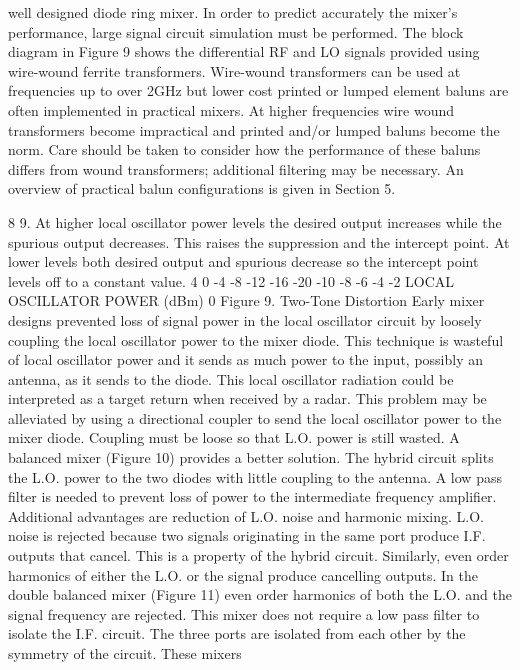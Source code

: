 \documentclass[a4paper,10pt]{article}
\begin{document}
well designed diode ring mixer. In order to predict accurately the mixer’s performance, large signal circuit
simulation must be performed.
The block diagram in Figure 9 shows the differential RF and LO signals provided using wire-wound ferrite
transformers. Wire-wound transformers can be used at frequencies up to over 2GHz but lower cost printed or
lumped element baluns are often implemented in practical mixers. At higher frequencies wire wound
transformers become impractical and printed and/or lumped baluns become the norm. Care should be taken to
consider how the performance of these baluns differs from wound transformers; additional filtering may be
necessary. An overview of practical balun configurations is given in Section 5.

	
	
	8
	9. At higher local oscillator power levels the desired output increases
	while the spurious output decreases. This raises the suppression and
	the intercept point. At lower levels both desired output and spurious
	decrease so the intercept point levels off to a constant value.
	4
	0
	-4
	-8
	-12
	-16
	-20
	-10
	-8
	-6
	-4
	-2
	LOCAL OSCILLATOR POWER (dBm)
	0
	Figure 9. Two-Tone Distortion
	Early mixer designs prevented loss of signal power in the local
	oscillator circuit by loosely coupling the local oscillator power to the
	mixer diode. This technique is wasteful of local oscillator power and it
	sends as much power to the input, possibly an antenna, as it sends to
	the diode. This local oscillator radiation could be interpreted as a
	target return when received by a radar. This problem may be alleviated
	by using a directional coupler to send the local oscillator power to the
	mixer diode. Coupling must be loose so that L.O. power is still wasted.
	A balanced mixer (Figure 10) provides a better solution. The hybrid
	circuit splits the L.O. power to the two diodes with little coupling to the
	antenna. A low pass filter is needed to prevent loss of power to the
	intermediate frequency amplifier. Additional advantages are reduction
	of L.O. noise and harmonic mixing. L.O. noise is rejected because two
	signals originating in the same port produce I.F. outputs that cancel.
	This is a property of the hybrid circuit. Similarly, even order harmonics
	of either the L.O. or the signal produce cancelling outputs.
	In the double balanced mixer (Figure 11) even order harmonics of both
	the L.O. and the signal frequency are rejected. This mixer does not
	require a low pass filter to isolate the I.F. circuit. The three ports are
	isolated from each other by the symmetry of the circuit. These mixers
\end{document}
